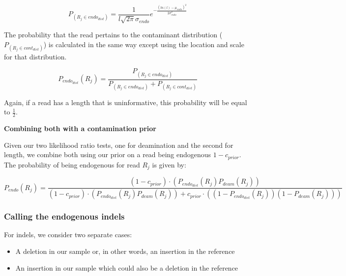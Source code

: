 \documentclass[a4paper,12pt]{article}
\begin{document}
\begin{equation}
P_(R_j \in endo_{dist}) = \frac {1} {l \sqrt{2\pi} \sigma_{endo}} e^{ - \frac{(ln(l) - \mu_{endo})^2 }  {2 \sigma_{endo}^2} } 
\end{equation}

\noindent The probability that the read pertains to the contaminant distribution ($P_(R_j \in cont_{dist})$) is calculated in the same way except using the location and scale for that distribution. 

\begin{equation}
P_{endo_{dist} }(R_j) = \frac {P_(R_j \in endo_{dist})} {P_(R_j \in endo_{dist}) + P_(R_j \in cont_{dist})}
\end{equation}

\noindent Again, if a read has a length that is uninformative, this probability will be equal to $\frac {1} {2}$.

{\bf Combining both with a contamination prior}

Given our two likelihood ratio tests, one for deamination and the second for length, we combine both using our prior on a read being endogenous $1-c_{prior}$. The probability of being endogenous for read $R_j$ is given by:

\begin{equation}
P_{endo} (R_j) = \frac {  (1-c_{prior}) \cdot ( P_{endo_{dist} }(R_j) P_{deam}(R_j) ) } {  (1-c_{prior}) \cdot ( P_{ endo_{dist} }(R_j) P_{deam}(R_j)) + c_{prior} \cdot ( (1-P_{endo_{dist} }(R_j)) (1- P_{deam}(R_j) )) }
\end{equation}






\subsubsection{Calling the endogenous indels}

For indels, we consider two separate cases:

\begin{itemize}
\item A deletion in our sample or, in other words, an insertion in the reference 
\item An insertion in our sample which could also be a deletion in the reference
\end{itemize}
\end{document}
